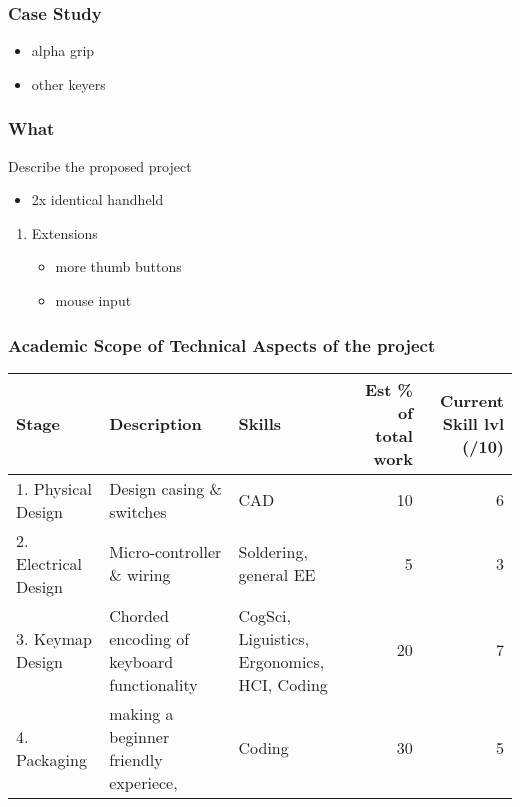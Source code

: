 \documentclass[11pt]{article}
\begin{document}
\subsubsection{Case Study}
\label{sec:orgb609c05}
\begin{itemize}
\item alpha grip
\item other keyers
\end{itemize}
\subsubsection{What}
\label{sec:org54d821f}
Describe the proposed project
\begin{itemize}
\item 2x identical handheld
\end{itemize}
\begin{enumerate}
\item Extensions
\label{sec:orgf1f5d26}
\begin{itemize}
\item more thumb buttons
\item mouse input
\end{itemize}
\end{enumerate}

\subsubsection{Academic Scope of Technical Aspects of the project}
\label{sec:orge7dfda8}

\begin{center}
\begin{tabular}{lllrr}
Stage & Description & Skills & Est \% of total work & Current Skill lvl (/10)\\
\hline
1. Physical Design & Design casing \& switches & CAD & 10 & 6\\
2. Electrical Design & Micro-controller \& wiring & Soldering, general EE & 5 & 3\\
3. Keymap Design & Chorded encoding of keyboard functionality & CogSci, Liguistics, Ergonomics, HCI, Coding & 20 & 7\\
4. Packaging & making a beginner friendly experiece, & Coding & 30 & 5\\
\end{tabular}
\end{center}
\end{document}
